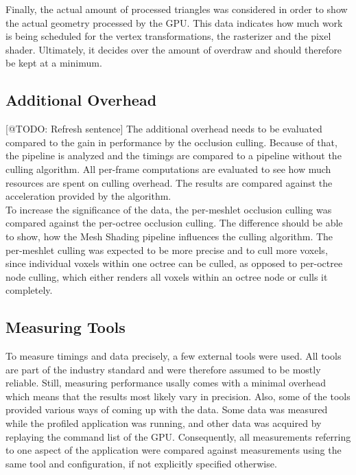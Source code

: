 \noindent
Finally, the actual amount of processed triangles was considered in order to show the actual geometry processed 
by the \ac{GPU}. This data indicates how much work is being scheduled for the vertex transformations, the rasterizer 
and the pixel shader. Ultimately, it decides over the amount of overdraw and should therefore be kept at a minimum.





\subsection*{Additional Overhead}

[@TODO: Refresh sentence]
The additional overhead needs to be evaluated compared to the gain in performance by the occlusion culling. 
Because of that, the pipeline is analyzed and the timings are compared to a pipeline without the culling 
algorithm. All per-frame computations are evaluated to see how much resources are spent on culling overhead. 
The results are compared against the acceleration provided by the algorithm.\\

\noindent
To increase the significance of the data, the per-meshlet occlusion culling was compared against the 
per-octree occlusion culling. The difference should be able to show, how the Mesh Shading pipeline 
influences the culling algorithm. The per-meshlet culling was expected to be more precise and to cull 
more voxels, since individual voxels within one octree can be culled, as opposed to per-octree node 
culling, which either renders all voxels within an octree node or culls it completely. 

%
%


\subsection*{Measuring Tools}

To measure timings and data precisely, a few external tools were used. All tools are part of the industry 
standard and were therefore assumed to be mostly reliable. Still, measuring performance usally comes with 
a minimal overhead which means that the results most likely vary in precision. Also, some of the tools 
provided various ways of coming up with the data. Some data was measured while the profiled application 
was running, and other data was acquired by replaying the command list of the \ac{GPU}. Consequently, all 
measurements referring to one aspect of the application were compared against measurements using the same 
tool and configuration, if not explicitly specified otherwise. \\


